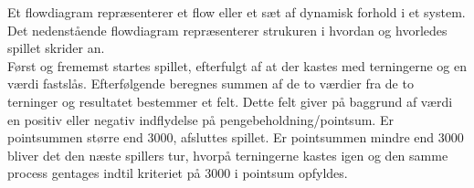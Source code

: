 \noindent Et flowdiagram repræsenterer et flow eller et sæt af dynamisk forhold i et system.
Det nedenstående flowdiagram repræsenterer strukuren i hvordan og hvorledes spillet skrider an.\\

\noindent Først og frememst startes spillet, efterfulgt af at der kastes med terningerne og en værdi fastslås.
Efterfølgende beregnes summen af de to værdier fra de to terninger og resultatet bestemmer et felt.
Dette felt giver på baggrund af værdi en positiv eller negativ indflydelse på pengebeholdning/pointsum.
Er pointsummen større end 3000, afsluttes spillet.
Er pointsummen mindre end 3000 bliver det den næste spillers tur, hvorpå terningerne kastes igen og den samme process gentages indtil kriteriet på 3000 i pointsum opfyldes.\\

